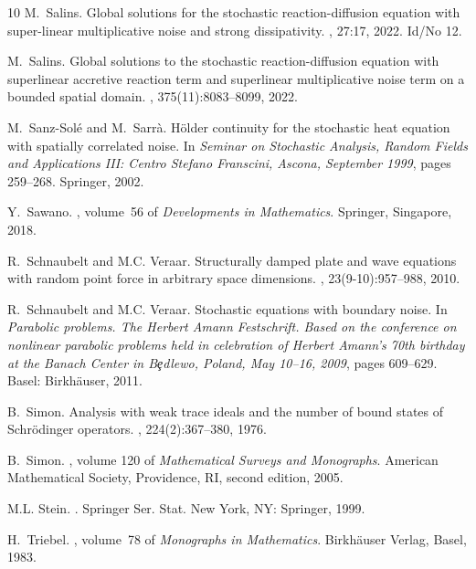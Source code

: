\documentclass[reqno]{amsart}
\theoremstyle{plain}
\theoremstyle{remark}
\theoremstyle{plain}
\numberwithin{equation}{section}
\newcommand{\1}{\one}
\begin{document}
\begin{thebibliography}{10}
M.~Salins.
\newblock Global solutions for the stochastic reaction-diffusion equation with
  super-linear multiplicative noise and strong dissipativity.
, 27:17, 2022.
\newblock Id/No 12.

M.~Salins.
\newblock Global solutions to the stochastic reaction-diffusion equation with
  superlinear accretive reaction term and superlinear multiplicative noise term
  on a bounded spatial domain.
, 375(11):8083--8099, 2022.

M.~Sanz-Sol{\'e} and M.~Sarr{\`a}.
\newblock H{\"o}lder continuity for the stochastic heat equation with spatially
  correlated noise.
\newblock In {\em Seminar on Stochastic Analysis, Random Fields and
  Applications III: Centro Stefano Franscini, Ascona, September 1999}, pages
  259--268. Springer, 2002.

Y.~Sawano.
, volume~56 of {\em Developments in
  Mathematics}.
\newblock Springer, Singapore, 2018.

R.~Schnaubelt and M.C. Veraar.
\newblock Structurally damped plate and wave equations with random point force
  in arbitrary space dimensions.
, 23(9-10):957--988, 2010.

R.~Schnaubelt and M.C. Veraar.
\newblock Stochastic equations with boundary noise.
\newblock In {\em Parabolic problems. The Herbert Amann Festschrift. Based on
  the conference on nonlinear parabolic problems held in celebration of Herbert
  Amann's 70th birthday at the Banach Center in B\c{e}dlewo, Poland, May
  10--16, 2009}, pages 609--629. Basel: Birkh{\"a}user, 2011.

B.~Simon.
\newblock Analysis with weak trace ideals and the number of bound states of
  {S}chr\"{o}dinger operators.
, 224(2):367--380, 1976.

B.~Simon.
, volume 120 of {\em
  Mathematical Surveys and Monographs}.
\newblock American Mathematical Society, Providence, RI, second edition, 2005.

M.L. Stein.
.
\newblock Springer Ser. Stat. New York, NY: Springer, 1999.

H.~Triebel.
, volume~78 of {\em Monographs in
  Mathematics}.
\newblock Birkh\"auser Verlag, Basel, 1983.


\end{thebibliography}
\end{document}

